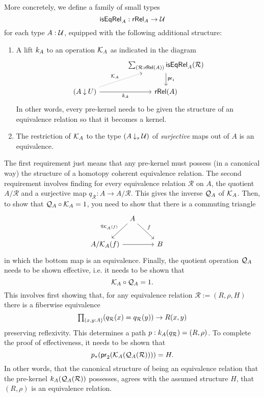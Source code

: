 More concretely, we define a family of small types
\begin{equation*}
\mathsf{isEqRel}_A:\mathsf{rRel}_A\to\mathcal{U}
\end{equation*}
for each type $A:\mathcal{U}$, equipped with the following additional structure:
\begin{enumerate}
\item A lift $k_A$ to an operation $\mathcal{K}_A$ as indicated in the diagram
\begin{equation*}
\begin{tikzcd}[column sep=large]
& \sm{\mathcal{R}:\mathsf{rRel}(A)}\mathsf{isEqRel}_A(\mathcal{R}) \arrow[d,->,"\proj 1"] \\
(A \mathbin{{\downarrow}} U) \arrow[r,swap,"\prekersym_A"] \arrow[ur,densely dotted,"\kersym_A"] & \mathsf{rRel}(A)
\end{tikzcd}
\end{equation*}
In other words, every pre-kernel needs to be given the structure of an equivalence relation so that it becomes a kernel.
\item The restriction of $\mathcal{K}_A$ to the type $(A\mathbin{\downarrow_s}\mathcal{U})$ of \emph{surjective} maps out of $A$ is an equivalence.
\end{enumerate}

The first requirement just means that any pre-kernel must possess (in a canonical way) the structure of a homotopy coherent equivalence relation. The second requirement involves finding for every equivalence relation $\mathcal{R}$ on $A$, the quotient $A/\mathcal{R}$ and a surjective map $q_{\mathcal{R}} : A\to A/\mathcal{R}$. This gives the inverse $\mathcal{Q}_A$ of $\mathcal{K}_A$. Then, to show that $\mathcal{Q}_A\circ \mathcal{K}_A=1$, you need to show that there is a commuting triangle
\begin{equation*}
\begin{tikzcd}[column sep=tiny]
& A \arrow[dl,swap,"q_{\kersym_A(f)}"] \arrow[dr,"f"] & \phantom{A/\kersym_A(f)} \\
A/\kersym_A(f) \arrow[rr] & & B
\end{tikzcd}
\end{equation*}
in which the bottom map is an equivalence. Finally, the quotient operation $\mathcal{Q}_A$ needs to be shown effective, i.e. it needs to be shown that \[\mathcal{K}_A\circ \mathcal{Q}_A =1.\]
This involves first showing that, for any equivalence relation $\mathcal{R}:=(R,\rho,H)$ there is a fiberwise equivalence
\begin{equation*}
\prd{x,y:A} (q_{\mathcal{R}}(x)=q_{\mathcal{R}}(y)) \to{} R(x,y)
\end{equation*}
preserving reflexivity. This determines a path $p : k_A(q_{\mathcal{R}})=(R,\rho)$. To complete the proof of effectiveness, it needs to be shown that \[{p}_{*}\mathopen{}\left({\mathsf{pr}_2(\mathcal{K}_A(\mathcal{Q}_A(\mathcal{R})))}\right)\mathclose{}= H.\] 
In other words, that the canonical structure of being an equivalence relation that the pre-kernel $k_A(\mathcal{Q}_A(\mathcal{R}))$ possesses, agrees with the assumed structure $H$, that $(R,\rho)$ is an equivalence relation.

